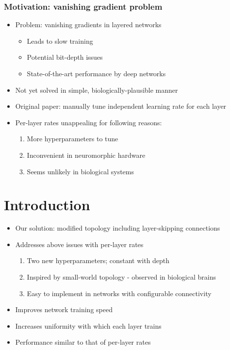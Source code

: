 \documentclass[pdf]{beamer}
\begin{document}
\begin{frame}
	\frametitle{Motivation: vanishing gradient problem}
	\begin{itemize}
		\item<1-> Problem: vanishing gradients in layered networks
		\begin{itemize}
			\item<2-> Leads to slow training
			\item<3-> Potential bit-depth issues
			\item<4-> State-of-the-art performance by deep networks
		\end{itemize}
		\item<5-> Not yet solved in simple, biologically-plausible manner
		\item<6-> Original paper: manually tune independent learning rate for each layer
		\item<7-> Per-layer rates unappealing for following reasons:
		\begin{enumerate}
			\item<8-> More hyperparameters to tune
			\item<9-> Inconvenient in neuromorphic hardware
			\item<10-> Seems unlikely in biological systems
		\end{enumerate}
	\end{itemize}
\end{frame}

\section{Introduction} %
\begin{frame}
	\begin{itemize}
		\frametitle{Introduction}
		\item<1-> Our solution: modified topology including layer-skipping connections
		\item<2-> Addresses above issues with per-layer rates
		\begin{enumerate}
			\item<3-> Two new hyperparameters; constant with depth
			\item<4-> Inspired by small-world topology - observed in biological brains
			\item<5-> Easy to implement in networks with configurable connectivity
		\end{enumerate}
		\item<6-> Improves network training speed
		\item<7-> Increases uniformity with which each layer trains
		\item<8-> Performance similar to that of per-layer rates
	\end{itemize}
\end{frame}
\end{document}
